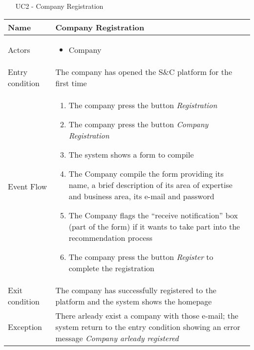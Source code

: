 			
		
			
			\begin{table} [H]
				\centering
					\begin{itemize}
					\item [UC2] - Company Registration
				\end{itemize}
				\begin{tabular}{|| P{7.5cm} | P{7.5cm} ||}
					\hline
					Name & Company Registration \\
					\hline
					Actors & \parbox{5cm}{\begin{itemize}
							\item Company
						\end{itemize}
					} \\
					\hline
					Entry condition & The company has opened the S\&C platform for the first time \\
					\hline
					Event Flow & \parbox{5cm}{\begin{enumerate}
							\item The company press the button \textit{Registration}
							\item The company press the button \textit{Company Registration}
							\item The system shows a form to compile
							\item The Company compile the form 
							providing its name, a brief description 
							of its area of expertise and business 
							area, its e-mail and password
							\item The Company flags the “receive 
							notification” box (part of the form) if it 
							wants to take part into the recommendation process
							\item The company press the button 
							\textit{Register} to complete the 
							registration
					\end{enumerate}} \\
					\hline 
					Exit condition & The company has successfully registered 
					to the platform and the system shows the 
					homepage \\
					\hline
					Exception & There arleady exist a company with 
					those e-mail; the system return to 
					the entry condition showing an 
					error message \textit{Company arleady 
						registered} \\
					\hline
				\end{tabular}
			\end{table}
			
		
			
